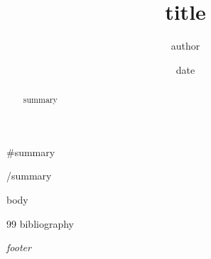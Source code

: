 \documentclass[11pt,a4paper]{article}
\title{\vspace{-12mm}\textbf{ {{title}} }}
\author{ {{author}} }
\date{ {{date}} }
\begin{document}
\maketitle

{{#summary}}
\begin{abstract}
{{summary}}
\end{abstract}
{{/summary}}

{{body}}

\begin{thebibliography}{99}
{{bibliography}}
\end{thebibliography}

\vfill
\begin{center}\footnotesize\itshape
{{footer}}
\end{center}
\end{document}
